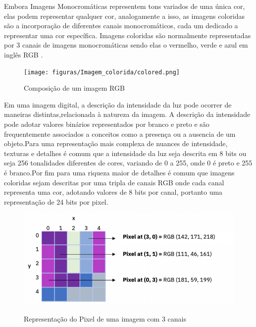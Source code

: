 Embora Imagens Monocromáticas representem tons variados de uma única cor, elas podem representar qualquer cor, analogamente a isso, as imagens coloridas são a incorporação de diferentes canais monocromáticos, cada um dedicado a representar uma cor específica. Imagens coloridas são normalmente representadas por 3 canais de imagens monocromáticas sendo elas o vermelho, verde e azul em inglês \ac{RGB} \cite{imagemIBM}.

\begin{figure}[!htb]
	\centering
    \caption{Composição de um imagem RGB}
	\texttt{[image: figuras/Imagem\_colorida/colored.png]}
	\label{fig:Composicao de um imagem RGB}
\end{figure}

Em uma imagem digital, a descrição da intensidade da luz pode ocorrer de maneiras distintas,relacionada à natureza da imagem. A descrição da intensidade pode adotar valores binários representados por branco e preto e são frequentemente associados a conceitos como a presença ou a ausencia de um objeto.Para  uma representação mais complexa de nuances de intensidade, texturas e detalhes é comum  que a intensidade da luz seja descrita em 8 bits ou seja 256 tonalidades diferentes de cores, variando de 0 a 255, onde 0 é preto e 255 é branco.Por fim para uma riqueza maior de detalhes é comum que imagens coloridas sejam descritas por uma tripla de canais \ac{RGB}  onde cada canal representa uma  cor, adotando valores de 8 bits por canal, portanto uma representação de 24 bits por pixel\cite{imagemIBM}.

\begin{figure}[!htb]
	\centering
	\caption{Representação do Pixel de uma imagem com 3 canais}
	\includegraphics[scale=1]{figuras/processamento_imagem/pixel.png}
	\label{fig:Representacao do Pixel de uma imagem com 3 canais}
\end{figure}



